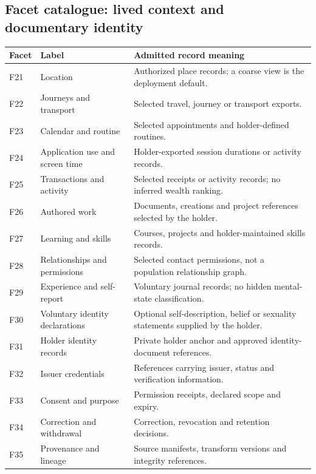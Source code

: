 \documentclass[11pt,a4paper]{article}
\newcommand{\newpagehead}[1]{\clearpage\subsection{#1}}
\begin{document}
\newpagehead{Facet catalogue: lived context and documentary identity}
\begin{center}\small\begin{tabularx}{\textwidth}{@{}p{}p{}X@{}}\toprule
\textbf{Facet} & \textbf{Label} & \textbf{Admitted record meaning}\\\midrule
F21 & Location & Authorized place records; a coarse view is the deployment default.\\[5pt]
F22 & Journeys and transport & Selected travel, journey or transport exports.\\[5pt]
F23 & Calendar and routine & Selected appointments and holder-defined routines.\\[5pt]
F24 & Application use and screen time & Holder-exported session durations or activity records.\\[5pt]
F25 & Transactions and activity & Selected receipts or activity records; no inferred wealth ranking.\\\midrule
F26 & Authored work & Documents, creations and project references selected by the holder.\\[5pt]
F27 & Learning and skills & Courses, projects and holder-maintained skills records.\\[5pt]
F28 & Relationships and permissions & Selected contact permissions, not a population relationship graph.\\[5pt]
F29 & Experience and self-report & Voluntary journal records; no hidden mental-state classification.\\[5pt]
F30 & Voluntary identity declarations & Optional self-description, belief or sexuality statements supplied by the holder.\\\midrule
F31 & Holder identity records & Private holder anchor and approved identity-document references.\\[5pt]
F32 & Issuer credentials & References carrying issuer, status and verification information.\\[5pt]
F33 & Consent and purpose & Permission receipts, declared scope and expiry.\\[5pt]
F34 & Correction and withdrawal & Correction, revocation and retention decisions.\\[5pt]
F35 & Provenance and lineage & Source manifests, transform versions and integrity references.\\\bottomrule
\end{tabularx}\end{center}
\end{document}
